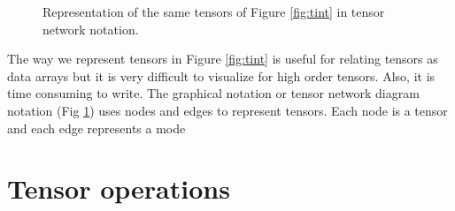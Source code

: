 \documentclass[11pt,a4paper,openright,oneside]{book}
\numberwithin{equation}{section}
\begin{document}
\begin{figure}
\centering
{}\qquad {}\qquad {}
\caption{
    Representation of the same tensors of Figure \ref{fig:tint} in tensor network notation.
}
\label{fig:tnot}
\end{figure}

The way we represent tensors in Figure \ref{fig:tint} is useful for
relating tensors as data arrays but it is very difficult to visualize for high order tensors. Also, it is time consuming
to write. The graphical notation or tensor network diagram notation (Fig \ref{fig:tnot}) uses nodes and edges to represent tensors. Each node is
a tensor and each edge represents a mode

\section{Tensor operations}
\end{document}
